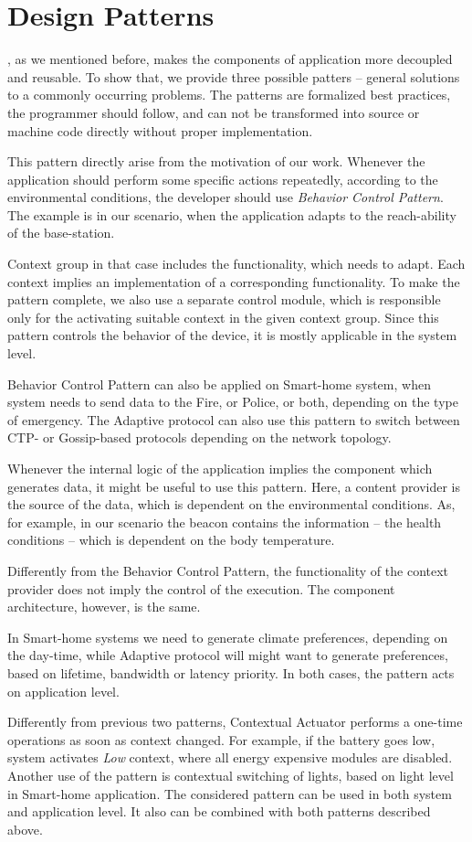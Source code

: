 \section{Design Patterns}

\conesc, as we mentioned before, makes the components of application more
decoupled and reusable. To show that, we provide three possible patters --
general solutions to a commonly occurring problems. The patterns are formalized
best practices, the programmer should follow, and can not be transformed into
source or machine code directly without proper implementation.

This pattern directly arise from the
motivation of our work. Whenever the application should perform some specific
actions repeatedly, according to the environmental conditions, the developer
should use \emph{Behavior Control Pattern}. The example is in our scenario, when
the application adapts to the reach-ability of the base-station.

Context group in that case includes the functionality, which needs to adapt.
Each context implies an implementation of a corresponding functionality. To make
the pattern complete, we also use a separate control module, which is
responsible only for the activating suitable context in the given context group. Since this pattern controls the behavior of the device, it is mostly applicable in the system level.

Behavior Control Pattern can also be applied on Smart-home system, when system
needs to send data to the Fire, or Police, or both, depending on the type of
emergency. The Adaptive protocol can also use this pattern to switch between
CTP- or Gossip-based protocols depending on the network topology.

Whenever the internal logic of the
application implies the component which generates data, it might be useful to
use this pattern. Here, a content provider is the source of the data, which is
dependent on the environmental conditions. As, for example, in our scenario the
beacon contains the information -- the health conditions -- which is dependent
on the body temperature.

Differently from the Behavior Control Pattern, the functionality of the context
provider does not imply the control of the execution. The component
architecture, however, is the same.

In Smart-home systems we need to generate climate preferences, depending on the
day-time, while Adaptive protocol will might want to generate preferences, based
on lifetime, bandwidth or latency priority. In both cases, the pattern acts on
application level.

 Differently from previous two patterns,
Contextual Actuator performs a one-time operations as soon as context changed.
For example, if the battery goes low, system activates \emph{Low} context, where
all energy expensive modules are disabled. Another use of the pattern is
contextual switching of lights, based on light level in Smart-home application.
The considered pattern can be used in both system and application level. It also
can be combined with both patterns described above.
